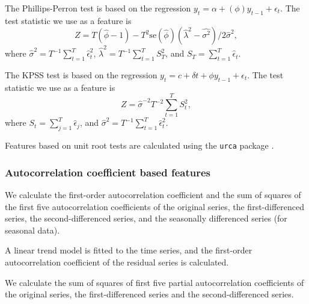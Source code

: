 \documentclass[11pt,a4paper,]{article}
\theoremstyle{definition}
\theoremstyle{definition}
\theoremstyle{definition}
\theoremstyle{remark}
\begin{document}
The Phillips-Perron test is based on the regression
\(y_t=\alpha+(\phi)y_{t-1}+ \epsilon_t\). The test statistic we use as a
feature is \[
  Z = T(\hat{\phi}-1)- T^2\text{se}(\hat{\phi})(\hat{\lambda}^2-\hat{\sigma^2})/2\hat\sigma^2,
\] where \(\hat\sigma^2= T^{-1}\sum_{t=1}^{T} \hat\epsilon_t^2\),
\(\hat\lambda^2=T^{-1} \sum_{t=1}^{T} S_T^2\), and
\(S_T = \sum_{t=1}^{T}\hat\epsilon_t\).

The KPSS test is based on the regression
\(y_t=c+\delta t+\phi y_{t-1}+\epsilon_t\). The test statistic we use as
a feature is \[
  Z= \hat{\sigma}^{-2} T^{-2}\sum_{t=1}^{T}S_t^2,
\] where \(S_t=\sum_{j=1}^T\hat{\epsilon}_j\), and
\(\hat{\sigma}^2 = T^{-1}\sum_{t=1}^{T} \hat\epsilon_t^2\).

Features based on unit root tests are calculated using the \texttt{urca}
package \autocite{pfaff2016package}.

\hypertarget{autocorrelation-coefficient-based-features}{%
\subsubsection*{Autocorrelation coefficient based
features}\label{autocorrelation-coefficient-based-features}}

We calculate the first-order autocorrelation coefficient and the sum of
squares of the first five autocorrelation coefficients of the original
series, the first-differenced series, the second-differenced series, and
the seasonally differenced series (for seasonal data).

A linear trend model is fitted to the time series, and the first-order
autocorrelation coefficient of the residual series is calculated.

We calculate the sum of squares of first five partial autocorrelation
coefficients of the original series, the first-differenced series and
the second-differenced series.

\printbibliography
\end{document}
